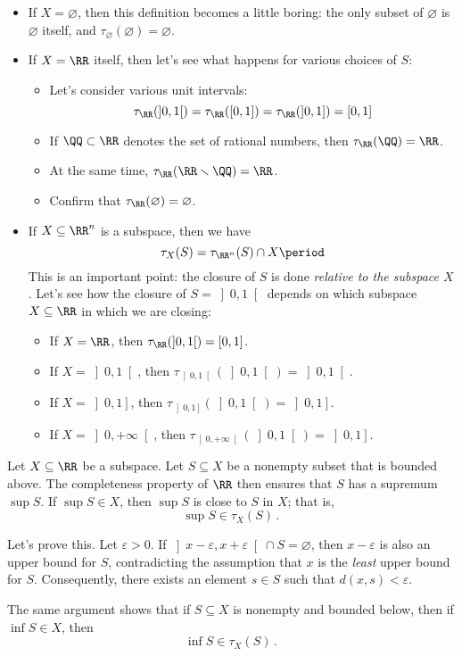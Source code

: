 \begin{exm}
	\begin{itemize}
		\item If $ X = \varnothing $, then this definition becomes a little boring:
			the only subset of $\varnothing$ is $\varnothing$ itself, and $\tau_{\varnothing}(\varnothing) = \varnothing$.
		\item If $ X = \RR$ itself, then let's see what happens for various choices of $S$:
			\begin{itemize}
				\item Let's consider various unit intervals:
					\[
						\tau_{\RR}(\left]0,1\right[) = \tau_{\RR}([0,1]) = \tau_{\RR}(\left]0,1\right]) = [0,1]
					\]
				\item If $\QQ \subset \RR$ denotes the set of rational numbers, then $\tau_{\RR}(\QQ) = \RR $.
				\item At the same time, $\tau_{\RR}(\RR \smallsetminus \QQ) = \RR$.
				\item Confirm that  $\tau_{\RR}(\varnothing)=\varnothing$.
			\end{itemize}
		\item If $ X \subseteq \RR^n$ is a subspace, then we have
			\[
				\tau_X(S) = \tau_{\RR^n}(S) \cap X \period
			\]
			This is an important point: the closure of $S$ is done \emph{relative to the subspace $X$}.
			Let's see how the closure of $S = \left]0,1\right[$ depends on which subspace $X \subseteq \RR $ in which we are closing:
			\begin{itemize}
				\item If $X=\RR$, then $\tau_{\RR}(\left]0,1\right[) = [0,1]$.
				\item If $X=\left]0,1\right[$, then $\tau_{\left]0,1\right[}(\left]0,1\right[) = \left]0,1\right[$.
				\item If $X=\left]0,1\right]$, then $\tau_{\left]0,1\right]}(\left]0,1\right[) = \left]0,1\right]$.
				\item If $X=\left]0,+\infty\right[$, then $\tau_{\left]0,+\infty\right[}(\left]0,1\right[) = \left]0,1\right]$.
			\end{itemize}
	\end{itemize}
\end{exm}

\begin{exm}
	Let $X \subseteq \RR$ be a subspace.
	Let $S \subseteq X$ be a nonempty subset that is bounded above.
	The completeness property of $\RR$ then ensures that $S$ has a supremum $\sup S$.
	If $\sup S \in X$, then $\sup S$ is close to $S$ in $X$;
	that is,
	\[
		\sup S \in \tau_X(S) \period
	\]

	Let's prove this.
	Let $\varepsilon>0$.
	If $ \left]x-\varepsilon, x+\varepsilon\right[ \cap S = \varnothing$, then $x-\varepsilon$ is also an upper bound for $S$, contradicting the assumption that $x$ is the \emph{least} upper bound for $S$.
	Consequently, there exists an element $ s \in S$ such that $d(x,s) < \varepsilon$.

	The same argument shows that if $S \subseteq X $ is nonempty and bounded below, then if $\inf S \in X$, then
	\[
		\inf S \in \tau_X(S) \period
	\]
\end{exm}

